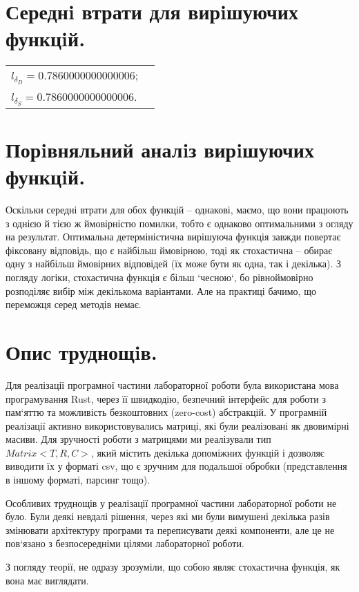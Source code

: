 \documentclass[a4paper,12pt]{article}
\begin{document}
\section{Середнi втрати для вирiшуючих функцiй.}

\begin{tabular}{ll}
$l_{\delta_D} = 0.7860000000000006$; & \\[2pt]
$l_{\delta_S} = 0.7860000000000006$. & \\
\end{tabular}

\section{Порiвняльний аналiз вирiшуючих функцiй.}

Оскільки середні втрати для обох функцій -- однакові, маємо, що вони працюють з однією й тією ж ймовірністю помилки, тобто є однаково оптимальними з огляду на результат. Оптимальна детерміністична вирішуюча функція завжди повертає фіксовану відповідь, що є найбільш ймовірною, тоді як стохастична -- обирає одну з найбільш ймовірних відповідей (їх може бути як одна, так і декілька). З погляду логіки, стохастична функція є більш `чесною`, бо рівноймовірно розподіляє вибір між декількома варіантами. Але на практиці бачимо, що переможця серед методів немає. 


\section{Опис труднощiв.}

Для реалізації програмної частини лабораторної роботи була використана мова програмування Rust, через її швидкодію, безпечний інтерфейс для роботи з пам`яттю та можливість безкоштовних (zero-cost) абстракцій. У програмній реалізації активно використовувались матриці, які були реалізовані як двовимірні масиви. Для зручності роботи з матрицями ми реалізували тип $Matrix<T, R, C>$, який містить декілька допоміжних функцій і дозволяє виводити їх у форматі csv, що є зручним для подальшої обробки (представлення в іншому форматі, парсинг тощо).

Особливих труднощів у реалізації програмної частини лабораторної роботи не було. Були деякі невдалі рішення, через які ми були вимушені декілька разів змінювати архітектуру програми та переписувати деякі компоненти, але це не пов`язано з безпосередніми цілями лабораторної роботи.

З погляду теорії, не одразу зрозуміли, що собою являє стохастична функція, як вона має виглядати.
\end{document}
